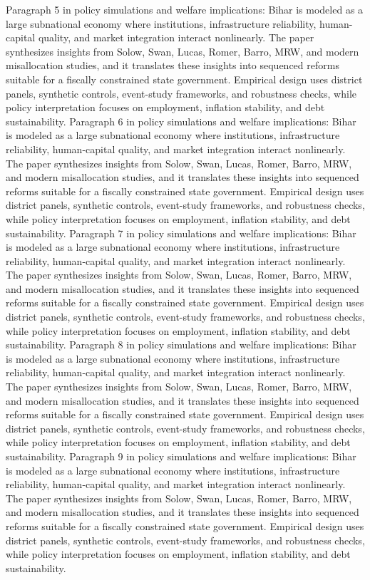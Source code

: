 \documentclass[preprint,12pt]{elsarticle}
\begin{document}
Paragraph 5 in policy simulations and welfare implications: Bihar is modeled as a large subnational economy where institutions, infrastructure reliability, human-capital quality, and market integration interact nonlinearly. The paper synthesizes insights from Solow, Swan, Lucas, Romer, Barro, MRW, and modern misallocation studies, and it translates these insights into sequenced reforms suitable for a fiscally constrained state government. Empirical design uses district panels, synthetic controls, event-study frameworks, and robustness checks, while policy interpretation focuses on employment, inflation stability, and debt sustainability.
Paragraph 6 in policy simulations and welfare implications: Bihar is modeled as a large subnational economy where institutions, infrastructure reliability, human-capital quality, and market integration interact nonlinearly. The paper synthesizes insights from Solow, Swan, Lucas, Romer, Barro, MRW, and modern misallocation studies, and it translates these insights into sequenced reforms suitable for a fiscally constrained state government. Empirical design uses district panels, synthetic controls, event-study frameworks, and robustness checks, while policy interpretation focuses on employment, inflation stability, and debt sustainability.
Paragraph 7 in policy simulations and welfare implications: Bihar is modeled as a large subnational economy where institutions, infrastructure reliability, human-capital quality, and market integration interact nonlinearly. The paper synthesizes insights from Solow, Swan, Lucas, Romer, Barro, MRW, and modern misallocation studies, and it translates these insights into sequenced reforms suitable for a fiscally constrained state government. Empirical design uses district panels, synthetic controls, event-study frameworks, and robustness checks, while policy interpretation focuses on employment, inflation stability, and debt sustainability.
Paragraph 8 in policy simulations and welfare implications: Bihar is modeled as a large subnational economy where institutions, infrastructure reliability, human-capital quality, and market integration interact nonlinearly. The paper synthesizes insights from Solow, Swan, Lucas, Romer, Barro, MRW, and modern misallocation studies, and it translates these insights into sequenced reforms suitable for a fiscally constrained state government. Empirical design uses district panels, synthetic controls, event-study frameworks, and robustness checks, while policy interpretation focuses on employment, inflation stability, and debt sustainability.
Paragraph 9 in policy simulations and welfare implications: Bihar is modeled as a large subnational economy where institutions, infrastructure reliability, human-capital quality, and market integration interact nonlinearly. The paper synthesizes insights from Solow, Swan, Lucas, Romer, Barro, MRW, and modern misallocation studies, and it translates these insights into sequenced reforms suitable for a fiscally constrained state government. Empirical design uses district panels, synthetic controls, event-study frameworks, and robustness checks, while policy interpretation focuses on employment, inflation stability, and debt sustainability.
\end{document}
